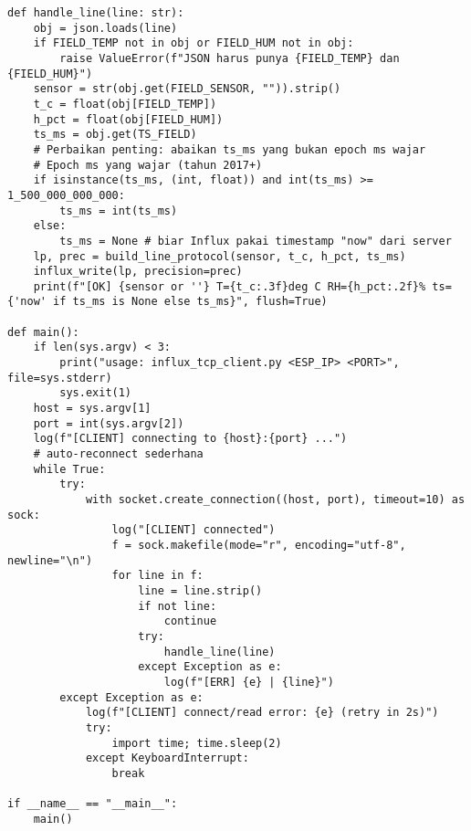 \documentclass[a4paper, 12pt]{article}
\begin{document}
\begin{lstlisting}[style=pythonstyle, caption={ESP32S3 to InfluxDB (python)}]
def handle_line(line: str):
    obj = json.loads(line)
    if FIELD_TEMP not in obj or FIELD_HUM not in obj:
        raise ValueError(f"JSON harus punya {FIELD_TEMP} dan {FIELD_HUM}")
    sensor = str(obj.get(FIELD_SENSOR, "")).strip()
    t_c = float(obj[FIELD_TEMP])
    h_pct = float(obj[FIELD_HUM])
    ts_ms = obj.get(TS_FIELD)
    # Perbaikan penting: abaikan ts_ms yang bukan epoch ms wajar
    # Epoch ms yang wajar (tahun 2017+)
    if isinstance(ts_ms, (int, float)) and int(ts_ms) >= 1_500_000_000_000:
        ts_ms = int(ts_ms)
    else:
        ts_ms = None # biar Influx pakai timestamp "now" dari server
    lp, prec = build_line_protocol(sensor, t_c, h_pct, ts_ms)
    influx_write(lp, precision=prec)
    print(f"[OK] {sensor or ''} T={t_c:.3f}deg C RH={h_pct:.2f}% ts={'now' if ts_ms is None else ts_ms}", flush=True)

def main():
    if len(sys.argv) < 3:
        print("usage: influx_tcp_client.py <ESP_IP> <PORT>", file=sys.stderr)
        sys.exit(1)
    host = sys.argv[1]
    port = int(sys.argv[2])
    log(f"[CLIENT] connecting to {host}:{port} ...")
    # auto-reconnect sederhana
    while True:
        try:
            with socket.create_connection((host, port), timeout=10) as sock:
                log("[CLIENT] connected")
                f = sock.makefile(mode="r", encoding="utf-8", newline="\n")
                for line in f:
                    line = line.strip()
                    if not line:
                        continue
                    try:
                        handle_line(line)
                    except Exception as e:
                        log(f"[ERR] {e} | {line}")
        except Exception as e:
            log(f"[CLIENT] connect/read error: {e} (retry in 2s)")
            try:
                import time; time.sleep(2)
            except KeyboardInterrupt:
                break

if __name__ == "__main__":
    main()
\end{lstlisting}
\end{document}
